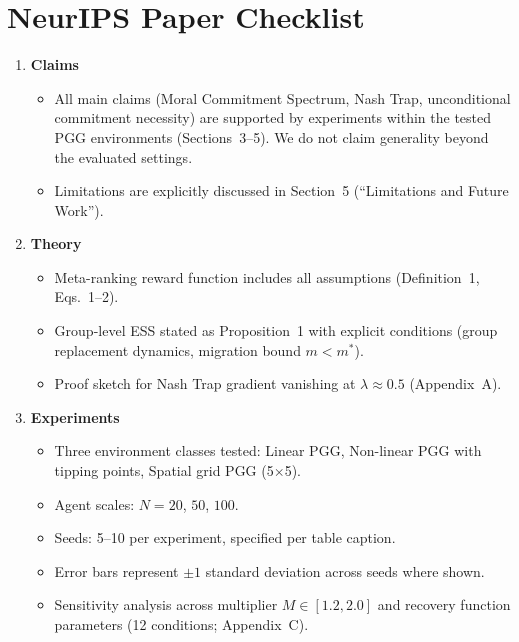
\section*{NeurIPS Paper Checklist}

\begin{enumerate}

\item {\bf Claims}
\begin{itemize}
    \item[$\checkmark$] All main claims (Moral Commitment Spectrum, Nash Trap, unconditional commitment necessity) are supported by experiments within the tested PGG environments (Sections~3--5). We do not claim generality beyond the evaluated settings.
    \item[$\checkmark$] Limitations are explicitly discussed in Section~5 (``Limitations and Future Work'').
\end{itemize}

\item {\bf Theory}
\begin{itemize}
    \item[$\checkmark$] Meta-ranking reward function includes all assumptions (Definition~1, Eqs.~1--2).
    \item[$\checkmark$] Group-level ESS stated as Proposition~1 with explicit conditions (group replacement dynamics, migration bound $m < m^*$).
    \item[$\checkmark$] Proof sketch for Nash Trap gradient vanishing at $\lambda \approx 0.5$ (Appendix~A).
\end{itemize}

\item {\bf Experiments}
\begin{itemize}
    \item[$\checkmark$] Three environment classes tested: Linear PGG, Non-linear PGG with tipping points, Spatial grid PGG (5$\times$5).
    \item[$\checkmark$] Agent scales: $N = 20$, $50$, $100$.
    \item[$\checkmark$] Seeds: 5--10 per experiment, specified per table caption.
    \item[$\checkmark$] Error bars represent $\pm 1$ standard deviation across seeds where shown.
    \item[$\checkmark$] Sensitivity analysis across multiplier $M \in [1.2, 2.0]$ and recovery function parameters (12 conditions; Appendix~C).
\end{itemize}


\end{enumerate}
